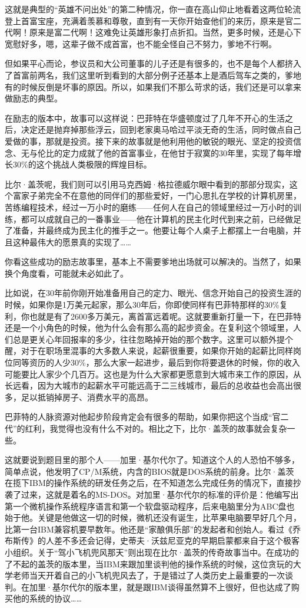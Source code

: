 这就是典型的``英雄不问出处''的第二种情况，你一直在高山仰止地看着这两位轮流登上首富宝座，充满着羡慕和尊敬，直到有一天你开始查他们的来历，原来是官二代啊！原来是富二代啊！这难免让英雄形象打点折扣。当然，更多时候，还是心下宽慰好多，嗯，这辈子做不成首富，也不能全怪自己不努力，爹地不行啊。

但如果平心而论，参议员和大公司董事的儿子还是有很多的，也不是每个人都挤入了首富前两名，我们这里听到看到的大部分例子还基本上是酒后驾车之类的，爹地有的时候反倒是坏事的原因。所以，如果我们不那么苛求的话，我们还是可以拿来做励志的典型。

在励志的版本中，故事可以这样说：巴菲特在华盛顿度过了几年不开心的生活之后，决定还是抛弃掉那些浮云，回到老家奥马哈过平淡无奇的生活，同时做点自己爱做的事，那就是投资。接下来的故事就是他利用他的敏锐的眼光、坚定的投资信念、无与伦比的定力成就了他的首富事业，在他甘于寂寞的30年里，实现了每年增长30\%的这个挑战人类极限的辉煌目标。

比尔·盖茨呢，我们则可以引用马克西姆·格拉德威尔眼中看到的那部分现实，这个富家子弟完全不在意他的同伴们的那些爱好，一门心思扎在学校的计算机房里，苦练编程技术，经过一万小时的磨练------任何人在自己的领域里经过一万小时的训练，都可以成就自己的一番事业------他在计算机的民主化时代到来之前，已经做足了准备，并最终成为民主化的推手之一。他要让每个人桌子上都摆上一台电脑，并且这种最伟大的愿景真的实现了\ldots{}\ldots{}

你看这些成功的励志故事里，基本上不需要爹地出场就可以解决的。当然了，如果换个角度看，可能就未必如此了。

比如说，在30年前你刚开始准备用自己的定力、眼光、信念开始自己的投资生涯的时候，如果你是1万美元起家，那么30年后，你即使同样有巴菲特那样的30\%复利，你也就是有了2600多万美元，离首富远着呢。这就要重新打量一下，在巴菲特还是一个小角色的时候，他为什么会有那么高的起步资金。在复利这个领域里，人们总是更关心年回报率的多少，往往忽略掉开始的那个数字。这里可以额外提个醒，对于在职场里混事的大多数人来说，起薪很重要，如果你开始的起薪比同样岗位同等资历的人少30\%，那么大家一起进步，最后到你将要退休的时候，你的收入可能要比人家少个几百万。这也是为什么大家都更愿意到大城市来工作的原因，从长远看，因为大城市的起薪水平可能远高于二三线城市，最后的总收益也会高出很多，足以抵销掉房子、消费水平的高昂。

巴菲特的人脉资源对他起步阶段肯定会有很多的帮助，如果你把这个当成``官二代''的红利，我觉得也没有什么不对的。相比之下，比尔·盖茨的故事就会复杂一些。

这就要说到题目里的那个人------加里·基尔代尔了。知道这个人的人恐怕不够多，简单点说，他发明了CP/M系统，内含的BIOS就是DOS系统的前身。比尔·盖茨在揽下IBM的操作系统的研发任务之后，在不知道怎么完成任务的情况下，直接抄袭了过来，这就是着名的MS-DOS。对加里·基尔代尔的标准的评价是：他编写出第一个微机操作系统程序语言和第一个软盘驱动程序，后来电脑里分为ABC盘也始于他。关键是他做这一切的时候，微机还没有诞生，比苹果电脑要早好几个月，比第一台IBM兼容机要早数年。他还是``家酿俱乐部''的发起者和创始人。看过《乔布斯传》的人差不多还会记得，史蒂夫·沃兹尼亚克的早期启蒙都来自于这个极客小组织。关于``驾小飞机兜风那天''则出现在比尔·盖茨的传奇故事当中。在成功的了不起的盖茨的版本里，当IBM来跟加里谈判他的操作系统的时候，这位贪玩的大学老师当天开着自己的小飞机兜风去了，于是错过了人类历史上最重要的一次谈判。在加里·基尔代尔的版本里，就是跟IBM谈得虽然算不上很好，但也达成了购买他的系统的协议\ldots{}\ldots{}

